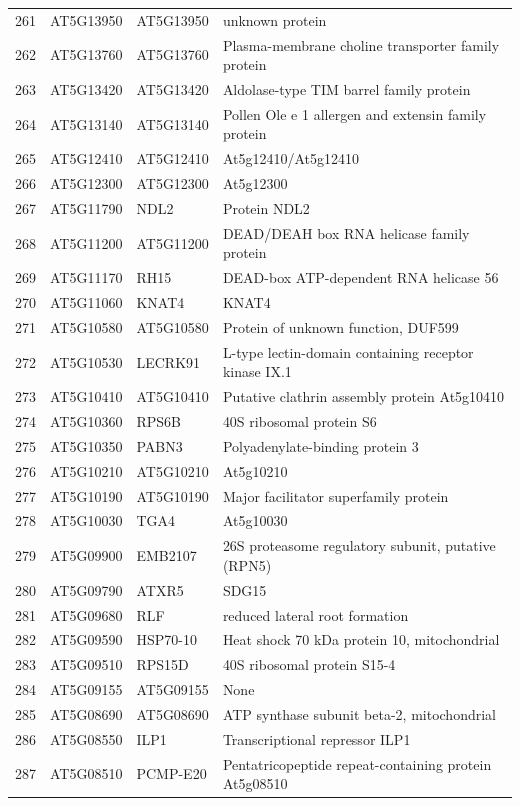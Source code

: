 \documentclass[11pt]{article}
\begin{document}
\begin{center}
\begin{tabular}{rlll}
261 & AT5G13950 & AT5G13950 & unknown protein\\
262 & AT5G13760 & AT5G13760 & Plasma-membrane choline transporter family protein\\
263 & AT5G13420 & AT5G13420 & Aldolase-type TIM barrel family protein\\
264 & AT5G13140 & AT5G13140 & Pollen Ole e 1 allergen and extensin family protein\\
265 & AT5G12410 & AT5G12410 & At5g12410/At5g12410\\
266 & AT5G12300 & AT5G12300 & At5g12300\\
267 & AT5G11790 & NDL2 & Protein NDL2\\
268 & AT5G11200 & AT5G11200 & DEAD/DEAH box RNA helicase family protein\\
269 & AT5G11170 & RH15 & DEAD-box ATP-dependent RNA helicase 56\\
270 & AT5G11060 & KNAT4 & KNAT4\\
271 & AT5G10580 & AT5G10580 & Protein of unknown function, DUF599\\
272 & AT5G10530 & LECRK91 & L-type lectin-domain containing receptor kinase IX.1\\
273 & AT5G10410 & AT5G10410 & Putative clathrin assembly protein At5g10410\\
274 & AT5G10360 & RPS6B & 40S ribosomal protein S6\\
275 & AT5G10350 & PABN3 & Polyadenylate-binding protein 3\\
276 & AT5G10210 & AT5G10210 & At5g10210\\
277 & AT5G10190 & AT5G10190 & Major facilitator superfamily protein\\
278 & AT5G10030 & TGA4 & At5g10030\\
279 & AT5G09900 & EMB2107 & 26S proteasome regulatory subunit, putative (RPN5)\\
280 & AT5G09790 & ATXR5 & SDG15\\
281 & AT5G09680 & RLF & reduced lateral root formation\\
282 & AT5G09590 & HSP70-10 & Heat shock 70 kDa protein 10, mitochondrial\\
283 & AT5G09510 & RPS15D & 40S ribosomal protein S15-4\\
284 & AT5G09155 & AT5G09155 & None\\
285 & AT5G08690 & AT5G08690 & ATP synthase subunit beta-2, mitochondrial\\
286 & AT5G08550 & ILP1 & Transcriptional repressor ILP1\\
287 & AT5G08510 & PCMP-E20 & Pentatricopeptide repeat-containing protein At5g08510\\

\end{tabular}
\end{center}
\end{document}
